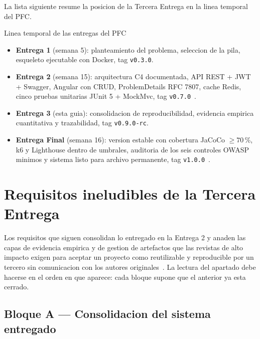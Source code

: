 \documentclass[11pt,a4paper]{article}
\begin{document}
La lista siguiente resume la posicion de la Tercera Entrega en la linea temporal del PFC.

\begin{cajadefinicion}{Linea temporal de las entregas del PFC}
    \begin{itemize}
        \item \textbf{Entrega 1} (semana 5): planteamiento del problema, seleccion de la pila, esqueleto ejecutable con Docker, tag \texttt{v0.3.0}.
        \item \textbf{Entrega 2} (semana 15): arquitectura C4 documentada, API REST + JWT + Swagger, Angular con CRUD, ProblemDetails RFC 7807, cache Redis, cinco pruebas unitarias JUnit 5 + MockMvc, tag \texttt{v0.7.0}~\cite{brown2023c4,rfc7807,jones2015jwt}.
        \item \textbf{Entrega 3} (esta guia): consolidacion de reproducibilidad, evidencia empirica cuantitativa y trazabilidad, tag \texttt{v0.9.0-rc}.
        \item \textbf{Entrega Final} (semana 16): version estable con cobertura JaCoCo $\geq 70$\,\%, k6 y Lighthouse dentro de umbrales, auditoria de los seis controles OWASP minimos y sistema listo para archivo permanente, tag \texttt{v1.0.0}~\cite{owasp2021top10,ortega2022securecoding}.
    \end{itemize}
\end{cajadefinicion}

\section{Requisitos ineludibles de la Tercera Entrega}

Los requisitos que siguen consolidan lo entregado en la Entrega 2 y anaden las capas de evidencia empirica y de gestion de artefactos que las revistas de alto impacto exigen para aceptar un proyecto como reutilizable y reproducible por un tercero sin comunicacion con los autores originales~\cite{wilkinson2016fair,acm2020artifact,smith2016software}. La lectura del apartado debe hacerse en el orden en que aparece: cada bloque supone que el anterior ya esta cerrado.

\subsection{Bloque A --- Consolidacion del sistema entregado}
\end{document}
